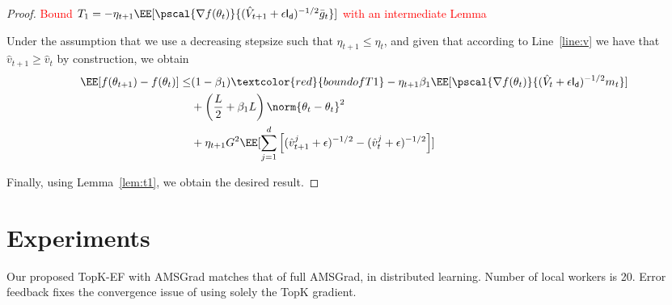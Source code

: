 \documentclass[11pt]{article}
\begin{document}
\begin{proof}
\textcolor{red}{Bound $ T_1 = -\eta_{t+1} \EE[\pscal{\nabla f(\theta_t)}{(\hat{V}_{t+1} + \epsilon \mathsf{I_d})^{-1/2} \bar{g}_t}]$ with an intermediate Lemma}

Under the assumption that we use a decreasing stepsize such that $\eta_{t+1} \leq \eta_{t}$, and given that according to Line~\ref{line:v} we have that $\hat v_{t+1} \geq \hat v_{t}$ by construction, we obtain 
\begin{equation}
\begin{split}
\EE[f(\theta_{t+1}) - f(\theta_{t}) ] \leq &   (1-\beta_1) \textcolor{red}{bound of T1}- \eta_{t+1} \beta_1\EE[\pscal{\nabla f(\theta_t)}{(\hat{V}_{t} + \epsilon \mathsf{I_d})^{-1/2} m_{t}}]\\
& +  \left(\frac{L}{2} + \beta_1 L \right) \norm{\theta_t - \theta_{t}}^2\\
&+   \eta_{t+1} G^2 \EE[\sum_{j=1}^d \left[(\hat{v}^j_{t+1} + \epsilon )^{-1/2} - (\hat{v}^j_{t} + \epsilon )^{-1/2}  \right] ]
\end{split}
\end{equation}

Finally, using Lemma~\ref{lem:t1}, we obtain the desired result.

\end{proof}




\newpage
\section{Experiments}\label{sec:experiment}
Our proposed TopK-EF with AMSGrad matches that of full AMSGrad, in distributed learning. Number of local workers is 20. Error feedback fixes the convergence issue of using solely the TopK gradient. 
\end{document}
